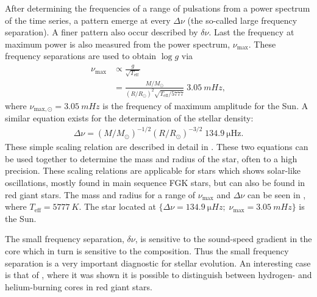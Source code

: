 After determining the frequencies of a range of pulsations from a power spectrum
of the time series, a pattern emerge at every $\Delta\nu$ (the so-called large
frequency separation). A finer pattern also occur described by $\delta\nu$. Last
the frequency at maximum power is also measured from the power spectrum,
$\nu_\mathrm{max}$. These frequency separations are used to obtain $\log g$ via
\begin{align}
  \nu_\mathrm{max} &\propto \frac{g}{\sqrt{T_\mathrm{eff}}} \\
                   &= \frac{M/M_\odot}{(R/R_\odot)^2 \sqrt{T_\mathrm{eff}/5777}}\; \SI{3.05}{mHz},\label{eq:scaling1}
\end{align}
where $\nu_{\mathrm{max},\odot}=\SI{3.05}{mHz}$ is the frequency of maximum
amplitude for the Sun. A similar equation exists for the determination of the
stellar density:
\begin{align}
  \Delta\nu = (M/M_\odot)^{-1/2} (R/R_\odot)^{-3/2}\; \SI{134.9}{\micro\hertz}.
\end{align}
These simple scaling relation are described in detail in \citet{Kjeldsen1995}.
These two equations can be used together to determine the mass and radius of the
star, often to a high precision. These scaling relations are applicable for
stars which shows solar-like oscillations, mostly found in main sequence FGK
stars, but can also be found in red giant stars. The mass and radius for a range
of $\nu_\mathrm{max}$ and $\Delta\nu$ can be seen in , where
$T_\mathrm{eff}=\SI{5777}{K}$. The star located at
$\{\Delta\nu=\SI{134.9}{\micro Hz};\;\nu_\mathrm{max}=\SI{3.05}{mHz}\}$ is the
Sun.

The small frequency separation, $\delta\nu$, is sensitive to the sound-speed
gradient in the core which in turn is sensitive to the composition. Thus the
small frequency separation is a very important diagnostic for stellar evolution.
An interesting case is that of \citet{Bedding2011}, where it was shown it is
possible to distinguish between hydrogen- and helium-burning cores in red giant
stars.

